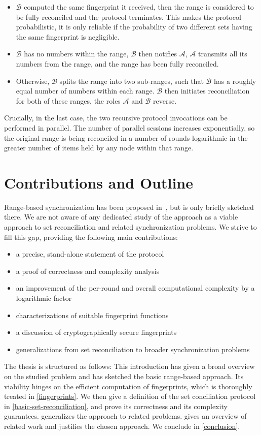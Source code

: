 \begin{itemize}
\item
  $\mathcal{B}$ computed the same fingerprint it received, then the range is considered to be fully reconciled and the protocol terminates. This makes the protocol probabilistic, it is only reliable if the probability of two different sets having the same fingerprint is negligible.
\item
  $\mathcal{B}$ has no numbers within the range, $\mathcal{B}$ then notifies $\mathcal{A}$, $\mathcal{A}$
  transmits all its numbers from the range, and the range has been
  fully reconciled.
\item
  Otherwise, $\mathcal{B}$ splits the range into two sub-ranges, such that $\mathcal{B}$
  has a roughly equal number of numbers within each range. $\mathcal{B}$ then
  initiates reconciliation for both of these ranges, the roles $\mathcal{A}$ and
  $\mathcal{B}$ reverse.
\end{itemize}

Crucially, in the last case, the two recursive protocol invocations can
be performed in parallel. The number of parallel sessions increases
exponentially, so the original range is being reconciled in a number
of rounds logarithmic in the greater number of items held by any node
within that range.

\section{Contributions and Outline}

Range-based synchronization has been proposed in~\cite{chen1999prototype}, but is only briefly sketched there. We are not aware of any dedicated study of the approach as a viable approach to set reconciliation and related synchronization problems. We strive to fill this gap, providing the following main contributions:

\begin{itemize}
\item a precise, stand-alone statement of the protocol
\item a proof of correctness and complexity analysis
\item an improvement of the per-round and overall computational complexity by a logarithmic factor
\item characterizations of suitable fingerprint functions
\item a discussion of cryptographically secure fingerprints
\item generalizations from set reconciliation to broader synchronization problems
\end{itemize}

The thesis is structured as follows: This introduction has given a broad overview on the studied problem and has sketched the basic range-based approach. Its viability hinges on the efficient computation of fingerprints, which is thoroughly treated in \cref{fingerprints}. We then give a definition of the set
conciliation protocol in \cref{basic-set-reconciliation}, and prove its correctness and its
complexity guarantees.  generalizes the approach to related problems. 
gives an overview of related work and justifies the chosen approach. We
conclude in \cref{conclusion}.